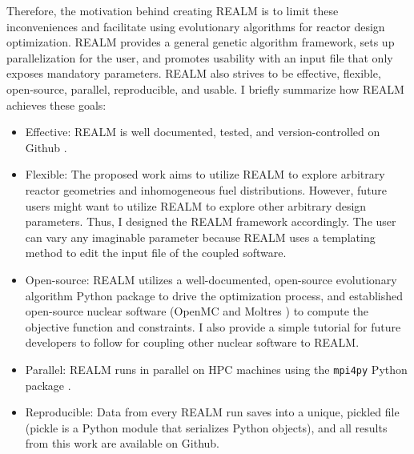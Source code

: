 Therefore, the motivation behind creating REALM is to limit these inconveniences and 
facilitate using evolutionary algorithms for reactor design optimization.
\gls{REALM} provides a general genetic algorithm framework, sets up 
parallelization for the user, and promotes usability with an input file 
that only exposes mandatory parameters.
REALM also strives to be effective, flexible, open-source, parallel, reproducible, 
and usable. 
I briefly summarize how \gls{REALM} achieves these goals:  
\begin{itemize}
    \item Effective: \gls{REALM} is well documented, tested, and 
    version-controlled on Github \cite{chee_arfcrealm_2021}.
    \item Flexible: The proposed work aims to utilize \gls{REALM} to 
    explore arbitrary reactor geometries and inhomogeneous fuel distributions. 
    However, future users might want to utilize \gls{REALM} 
    to explore other arbitrary design parameters. Thus, I designed the \gls{REALM}
    framework accordingly. The user can vary any imaginable parameter 
    because \gls{REALM} uses a templating method to edit the input file of the 
    coupled software.
    \item Open-source: \gls{REALM} utilizes a well-documented, open-source 
    evolutionary algorithm Python package to drive the optimization process, 
    and established open-source nuclear software (OpenMC \cite{romano_openmc_2013} and 
    Moltres \cite{lindsay_introduction_2018}) to compute the objective function 
    and constraints. I also provide a simple tutorial for future developers to 
    follow for coupling other nuclear software to \gls{REALM}.  
    \item Parallel: \gls{REALM} runs in parallel on \gls{HPC} machines using the 
    \texttt{mpi4py} Python package \cite{dalcin_mpi_2008}.
    \item Reproducible: Data from every REALM run saves into a unique, pickled 
    file (pickle is a Python module that serializes Python objects), and all 
    results from this work are available on Github. 
\end{itemize}

